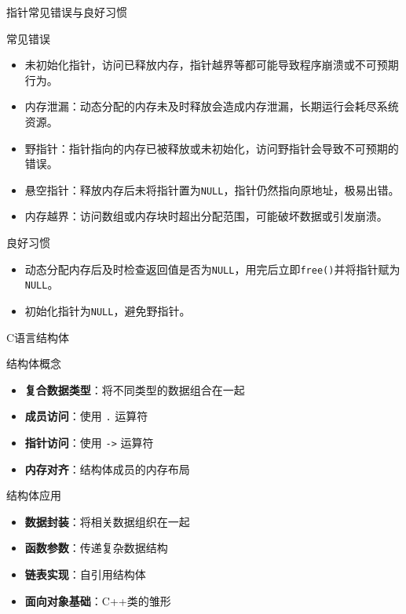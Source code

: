 \documentclass[UTF8,aspectratio=169]{beamer}
\begin{document}
\begin{frame}{指针常见错误与良好习惯}
    \begin{ytublock}{常见错误}
        \begin{itemize}
            \item 未初始化指针，访问已释放内存，指针越界等都可能导致程序崩溃或不可预期行为。
            \item 内存泄漏：动态分配的内存未及时释放会造成内存泄漏，长期运行会耗尽系统资源。
            \item 野指针：指针指向的内存已被释放或未初始化，访问野指针会导致不可预期的错误。
            \item 悬空指针：释放内存后未将指针置为\texttt{NULL}，指针仍然指向原地址，极易出错。
            \item 内存越界：访问数组或内存块时超出分配范围，可能破坏数据或引发崩溃。
        \end{itemize}
    \end{ytublock}
    \begin{ytublock}{良好习惯}
        \begin{itemize}
            \item 动态分配内存后及时检查返回值是否为\texttt{NULL}，用完后立即\texttt{free()}并将指针赋为\texttt{NULL}。
            \item 初始化指针为\texttt{NULL}，避免野指针。
        \end{itemize}
    \end{ytublock}
\end{frame}

\begin{frame}{C语言结构体}
    \begin{ytublock}{结构体概念}
        \begin{itemize}
            \item \textbf{复合数据类型}：将不同类型的数据组合在一起
            \item \textbf{成员访问}：使用 \texttt{.} 运算符
            \item \textbf{指针访问}：使用 \texttt{->} 运算符
            \item \textbf{内存对齐}：结构体成员的内存布局
        \end{itemize}
    \end{ytublock}

    \begin{ytublock}{结构体应用}
        \begin{itemize}
            \item \textbf{数据封装}：将相关数据组织在一起
            \item \textbf{函数参数}：传递复杂数据结构
            \item \textbf{链表实现}：自引用结构体
            \item \textbf{面向对象基础}：C++类的雏形
        \end{itemize}
    \end{ytublock}
\end{frame}
\end{document}
